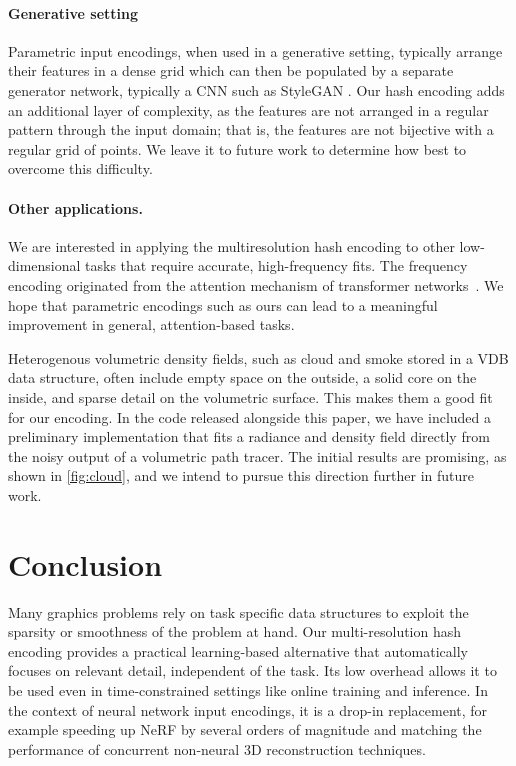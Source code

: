 \documentclass[acmtog,authorversion]{acmart}
\begin{document}
\paragraph{Generative setting} Parametric input encodings, when used in a generative setting, typically arrange their features in a dense grid which can then be populated by a separate generator network, typically a CNN such as StyleGAN \cite{chan2021efficient, devries2021unconstrained, peng2020convolutional}.  Our hash encoding adds an additional layer of complexity, as the features are not arranged in a regular pattern through the input domain; that is, the features are not bijective with a regular grid of points. We leave it to future work to determine how best to overcome this difficulty.


\paragraph{Other applications.}
We are interested in applying the multiresolution hash encoding to other low-dimensional tasks that require accurate, high-frequency fits.
The frequency encoding originated from the attention mechanism of transformer networks~\citep{vaswani2017attention}.
We hope that parametric encodings such as ours can lead to a meaningful improvement in general, attention-based tasks.

Heterogenous volumetric density fields, such as cloud and smoke stored in a VDB \cite{vdb,museth2021} data structure, often include empty space on the outside, a solid core on the inside, and sparse detail on the volumetric surface.
This makes them a good fit for our encoding.
In the code released alongside this paper, we have included a preliminary implementation that fits a radiance and density field directly from the noisy output of a volumetric path tracer.
The initial results are promising, as shown in \autoref{fig:cloud}, and we intend to pursue this direction further in future work.

\section{Conclusion}

Many graphics problems rely on task specific data structures to exploit the sparsity or smoothness of the problem at hand.
Our multi-resolution hash encoding provides a practical learning-based alternative that automatically focuses on relevant detail, independent of the task.
Its low overhead allows it to be used even in time-constrained settings like online training and inference.
In the context of neural network input encodings, it is a drop-in replacement, for example speeding up NeRF by several orders of magnitude and matching the performance of concurrent non-neural 3D reconstruction techniques.
\end{document}
